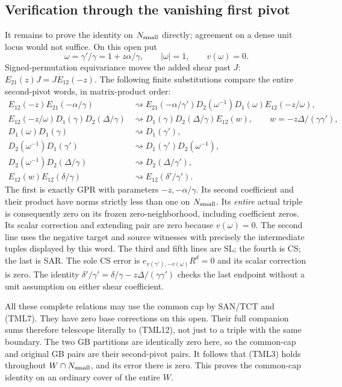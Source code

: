 \subsection{Verification through the vanishing first pivot}

It remains to prove the identity on $N_{\rm small}$ directly;
agreement on a dense unit locus would not suffice.  On this open
put
\[
       \omega=\gamma'/\gamma=1+z\alpha/\gamma,
       \qquad |\omega|=1,\qquad v(\omega)=0.
 \tag{TML16}
\]
Signed-permutation equivariance moves the added shear past $J$:
$E_{21}(z)J=JE_{12}(-z)$.  The following finite substitutions
compare the entire second-pivot words, in matrix-product order:
\[
\begin{split}
 E_{12}(-z)E_{21}(-\alpha/\gamma)
  &\rightsquigarrow
 E_{21}(-\alpha/\gamma')D_2(\omega^{-1})D_1(\omega)
                                      E_{12}(-z/\omega),\\
 E_{12}(-z/\omega)D_1(\gamma)D_2(\Delta/\gamma)
  &\rightsquigarrow
 D_1(\gamma)D_2(\Delta/\gamma)E_{12}(w),
       \qquad w=-z\Delta/(\gamma\gamma'),\\
 D_1(\omega)D_1(\gamma)&\rightsquigarrow D_1(\gamma'),\\
 D_2(\omega^{-1})D_1(\gamma')&\rightsquigarrow
                          D_1(\gamma')D_2(\omega^{-1}),\\
 D_2(\omega^{-1})D_2(\Delta/\gamma)&\rightsquigarrow
                                      D_2(\Delta/\gamma'),\\
 E_{12}(w)E_{12}(\delta/\gamma)&\rightsquigarrow
                                      E_{12}(\delta'/\gamma').
\end{split}
 \tag{TML17}
\]
The first is exactly GPR with parameters $-z,-\alpha/\gamma$.
Its second coefficient and their product have norms strictly
less than one on $N_{\rm small}$.  Its \emph{entire} actual
triple is consequently zero on its frozen zero-neighborhood,
including coefficient zeros.  Its scalar correction and
extending pair are zero because $v(\omega)=0$.
The second line uses the negative target and source witnesses
with precisely the intermediate tuples displayed by this word.
The third and fifth lines are SL; the fourth is CS; the last
is SAR.  The sole CS error is
$e_{v(\gamma'),-v(\omega)}R^d=0$ and its scalar correction
is zero.  The identity
$\delta'/\gamma'=\delta/\gamma-z\Delta/(\gamma\gamma')$
checks the last endpoint without a unit assumption on either
shear coefficient.

All these complete relations may use the common cap by SAN/TCT
and (TML7).  They have zero base corrections on this open.
Their full companion sums therefore telescope literally to
(TML12), not just to a triple with the same boundary.  The two
GB partitions are identically zero here, so the common-cap and
original GB pairs are their second-pivot pairs.  It follows
that (TML3) holds throughout $W\cap N_{\rm small}$, and its
error there is zero.  This proves the common-cap identity on an
ordinary cover of the entire $W$.

